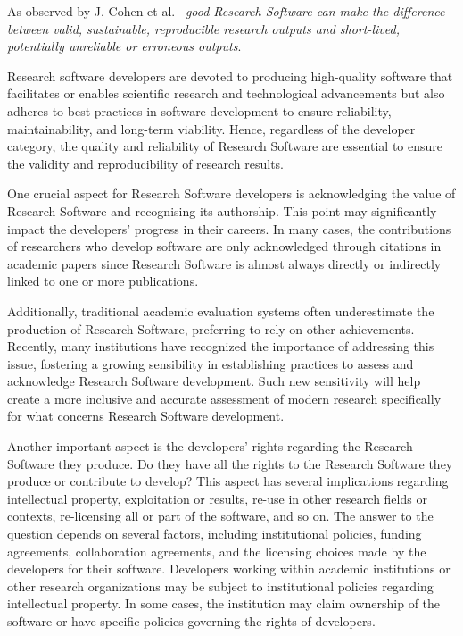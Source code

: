As observed by J. Cohen et al.~\cite{TheFourPillarsOfRSE_2021} \textit{good Research Software can make the difference between valid, sustainable, reproducible research outputs and short-lived, potentially unreliable or erroneous outputs}.

Research software developers are devoted to producing high-quality software that facilitates or enables scientific research and technological advancements but also adheres to best practices in software development to ensure reliability, maintainability, and long-term viability. Hence, regardless of the developer category, the quality and reliability of Research Software are essential to ensure the validity and reproducibility of research results.

One crucial aspect for Research Software developers is acknowledging the value of Research Software and recognising its authorship. This point may significantly impact the developers' progress in their careers. In many cases, the contributions of researchers who develop software are only acknowledged through citations in academic papers since Research Software is almost always directly or indirectly linked to one or more publications.

Additionally, traditional academic evaluation systems often underestimate the production of Research Software, preferring to rely on other achievements. Recently, many institutions have recognized the importance of addressing this issue, fostering a growing sensibility in establishing practices to assess and acknowledge Research Software development. Such new sensitivity will help create a more inclusive and accurate assessment of modern research specifically for what concerns Research Software development.

Another important aspect is the developers' rights regarding the Research Software they produce. Do they have all the rights to the Research Software they produce or contribute to develop? This aspect has several implications regarding intellectual property, exploitation or results, re-use in other research fields or contexts, re-licensing all or part of the software, and so on. The answer to the question depends on several factors, including institutional policies, funding agreements, collaboration agreements, and the licensing choices made by the developers for their software. Developers working within academic institutions or other research organizations may be subject to institutional policies regarding intellectual property. In some cases, the institution may claim ownership of the software or have specific policies governing the rights of developers.

